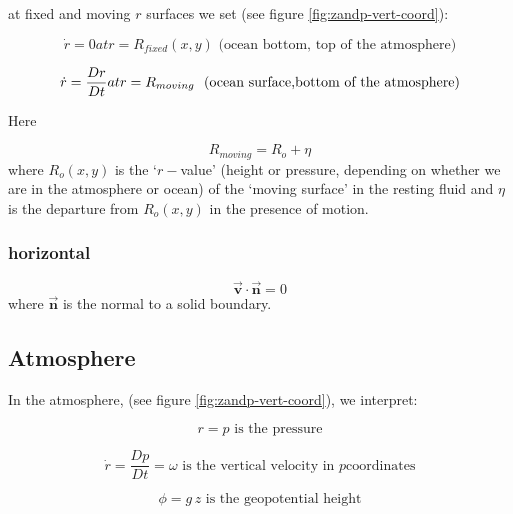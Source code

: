 at fixed and moving $r$ surfaces we set (see figure \ref{fig:zandp-vert-coord}):

\begin{equation}
\dot{r}=0atr=R_{fixed}(x,y)\text{ (ocean bottom, top of the atmosphere)}
\label{eq:fixedbc}
\end{equation}

\begin{equation}
\dot{r}=\frac{Dr}{Dt}atr=R_{moving}\text{ \
(ocean surface,bottom of the atmosphere)}  \label{eq:movingbc}
\end{equation}

Here

\begin{equation*}
R_{moving}=R_{o}+\eta
\end{equation*}
where $R_{o}(x,y)$ is the `$r-$value' (height or pressure, depending on
whether we are in the atmosphere or ocean) of the `moving surface' in the
resting fluid and $\eta $ is the departure from $R_{o}(x,y)$ in the presence
of motion.

\subsubsection{horizontal}

\begin{equation}
\vec{\mathbf{v}}\cdot \vec{\mathbf{n}}=0  \label{eq:noflow}
\end{equation}
where $\vec{\mathbf{n}}$ is the normal to a solid boundary.

\subsection{Atmosphere}

In the atmosphere, (see figure \ref{fig:zandp-vert-coord}), we interpret:

\begin{equation}
r=p\text{ is the pressure}  \label{eq:atmos-r}
\end{equation}

\begin{equation}
\dot{r}=\frac{Dp}{Dt}=\omega \text{ is the vertical velocity in }p\text{
coordinates}  \label{eq:atmos-omega}
\end{equation}

\begin{equation}
\phi =g\,z\text{ is the geopotential height}  \label{eq:atmos-phi}
\end{equation}

